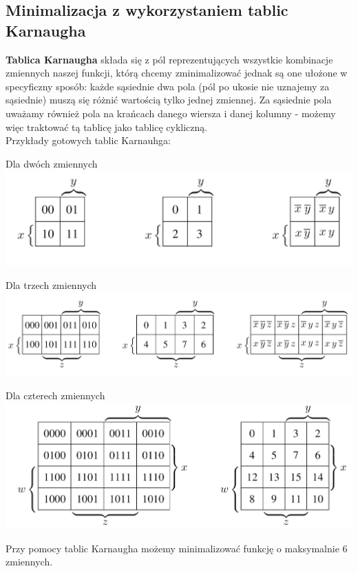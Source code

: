 \documentclass[12pt]{article}
\begin{document}
    \subsection{Minimalizacja z wykorzystaniem tablic Karnaugha}
    \begin{definition}
    \textbf{Tablica Karnaugha} składa się z pól reprezentujących wszystkie kombinacje zmiennych naszej funkcji, którą chcemy zminimalizować jednak są one ułożone w specyficzny sposób:
    każde sąsiednie dwa pola (pól po ukosie nie uznajemy za sąsiednie) muszą się różnić wartością tylko jednej zmiennej.
    Za sąsiednie pola uważamy również pola na krańcach danego wiersza i danej kolumny - możemy więc traktować tą tablicę jako tablicę cykliczną. \\
    
    Przykłady gotowych tablic Karnauhga: \\
    
    \begin{center}
    		Dla dwóch zmiennych \\
		\includegraphics[width=\linewidth]{karnaugh/2-vars.png}
		
		Dla trzech zmiennych \\
		\includegraphics[width=\linewidth]{karnaugh/3-vars.png}
		
		Dla czterech zmiennych \\
		\includegraphics[width=\linewidth]{karnaugh/4-vars.png}
	\end{center}
    
    Przy pomocy tablic Karnaugha możemy minimalizować funkcję o maksymalnie 6 zmiennych.
    \end{definition}
    
\end{document}
